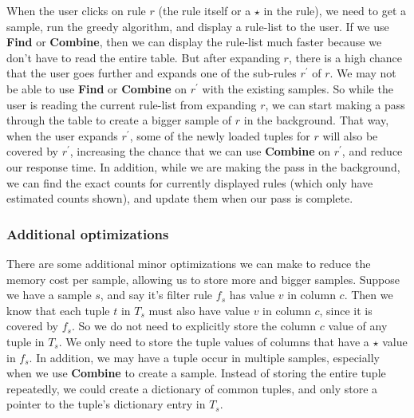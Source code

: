 \documentclass{sig-alternate}
\begin{document}
When the user clicks on rule $r$ (the rule itself or a $\star$ in the rule), we need to get a sample, run the greedy algorithm, and display a rule-list to the user. If we use \textbf{Find} or \textbf{Combine}, then we can display the rule-list much faster because we don't have to read the entire table. But after expanding $r$, there is a high chance that the user goes further and expands one of the sub-rules $r^{\prime}$ of $r$. We may not be able to use \textbf{Find} or \textbf{Combine} on $r^{\prime}$ with the existing samples. So while the user is reading the current rule-list from expanding $r$, we can start making a pass through the table to create a bigger sample of $r$ in the background. That way, when the user expands $r^{\prime}$, some of the newly loaded tuples for $r$ will also be covered by $r^{\prime}$, increasing the chance that we can use \textbf{Combine} on $r^{\prime}$, and reduce our response time. 
In addition, while we are making the pass in the background, we can find the exact counts for currently displayed rules (which only have estimated counts shown), and update them when our pass is complete.


\subsubsection{Additional optimizations}
There are some additional minor optimizations we can make to reduce the memory cost per sample, allowing us to store more and bigger samples. 
Suppose we have a sample $s$, and say it's filter rule $f_s$ has value $v$ in column $c$. Then we know that each tuple $t$ in $T_s$ must also have value $v$ in column $c$, since it is covered by $f_s$. So we do not need to explicitly store the column $c$ value of any tuple in $T_s$. We only need to store the tuple values of columns that have a $\star$ value in $f_s$.
In addition, we may have a tuple occur in multiple samples, especially when we use \textbf{Combine} to create a sample. Instead of storing the entire tuple repeatedly, we could create a dictionary of common tuples, and only store a pointer to the tuple's dictionary entry in $T_s$. 
\end{document}
